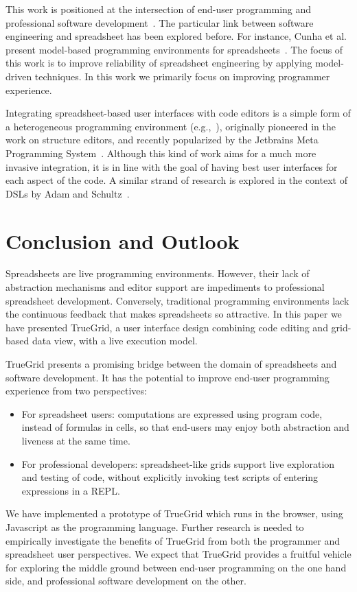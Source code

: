 \documentclass{llncs}
\begin{document}
This work is positioned at the intersection of end-user programming and professional software development~\cite{EUSE}. The particular link between software engineering and spreadsheet has been explored before. For instance, Cunha et al. present model-based programming environments for spreadsheets~\cite{cunha2014model}.
The focus of this work is to improve reliability of spreadsheet engineering by applying model-driven techniques. 
In this work we primarily focus on improving programmer experience.

Integrating spreadsheet-based user interfaces with code editors is a simple form of a heterogeneous programming environment (e.g.,~\cite{schrage2008beyond}), originally pioneered in the work on structure editors, and recently popularized by the Jetbrains Meta Programming System~\cite{MPS}. Although this kind of work aims for a much more invasive integration, it is in line with the goal of having best user interfaces for each aspect of the code. A similar strand of research is explored in the context of DSLs by Adam and Schultz~\cite{adam2015towards}. 



\section{Conclusion and Outlook}

Spreadsheets are live programming environments. However, their lack of abstraction mechanisms and editor support are impediments to professional spreadsheet development. Conversely, traditional programming environments lack the continuous feedback that makes spreadsheets so attractive. In this paper we have presented TrueGrid, a user interface design combining code editing and grid-based data view, with a live execution model.

TrueGrid presents a promising bridge between the domain of spreadsheets and software development. It has the potential to improve end-user programming experience from two perspectives:
\begin{itemize}
\item For spreadsheet users: computations are expressed using program code, instead of  formulas in cells, so that end-users may enjoy both abstraction and liveness at the same time.
\item For professional developers: spreadsheet-like grids support live exploration and testing of code, without explicitly invoking test scripts of entering expressions in a REPL.
\end{itemize}
We have implemented a prototype of TrueGrid which runs in the browser, using Javascript as the programming language. Further research is needed to empirically investigate the benefits of TrueGrid from both the programmer and spreadsheet user perspectives. 
We expect that TrueGrid provides a fruitful vehicle for exploring the middle ground between end-user programming on the one hand side, and professional software development on the other.




\end{document}
